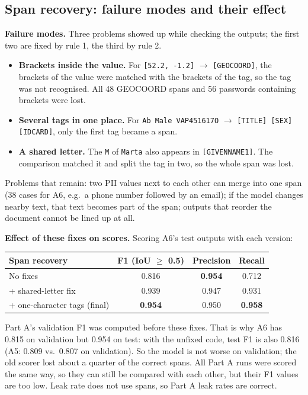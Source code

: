 \documentclass[10pt]{article}
\begin{document}
\subsection{Span recovery: failure modes and their effect}\label{app:b1}
\textbf{Failure modes.} Three problems showed up while checking the outputs; the first two are fixed by rule 1, the third by rule 2.
\begin{itemize}
  \item \textbf{Brackets inside the value.} For \texttt{[52.2, -1.2]} $\to$ \texttt{[GEOCOORD]}, the brackets of the value were matched with the brackets of the tag, so the tag was not recognised. All 48 GEOCOORD spans and 56 passwords containing brackets were lost.
  \item \textbf{Several tags in one place.} For \texttt{Ab Male VAP451617O} $\to$ \texttt{[TITLE] [SEX] [IDCARD]}, only the first tag became a span.
  \item \textbf{A shared letter.} The \texttt{M} of \texttt{Marta} also appears in \texttt{[GIVENNAME1]}. The comparison matched it and split the tag in two, so the whole span was lost.
\end{itemize}
Problems that remain: two PII values next to each other can merge into one span (38 cases for A6, e.g.\ a phone number followed by an email); if the model changes nearby text, that text becomes part of the span; outputs that reorder the document cannot be lined up at all.

\textbf{Effect of these fixes on scores.} Scoring A6's test outputs with each version:

\begin{center}
\begin{tabular}{@{}lccc@{}}
\toprule
Span recovery & F1 (IoU $\ge$ 0.5) & Precision & Recall \\
\midrule
No fixes & 0.816 & \textbf{0.954} & 0.712 \\
+ shared-letter fix & 0.939 & 0.947 & 0.931 \\
+ one-character tags (final) & \textbf{0.954} & 0.950 & \textbf{0.958} \\
\bottomrule
\end{tabular}
\end{center}

\noindent Part A's validation F1 was computed before these fixes. That is why A6 has 0.815 on validation but 0.954 on test: with the unfixed code, test F1 is also 0.816 (A5: 0.809 vs.\ 0.807 on validation). So the model is not worse on validation; the old scorer lost about a quarter of the correct spans. All Part A runs were scored the same way, so they can still be compared with each other, but their F1 values are too low. Leak rate does not use spans, so Part A leak rates are correct.
\end{document}

